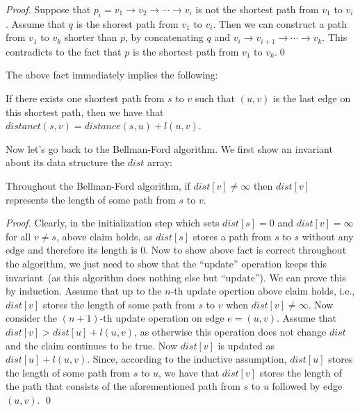 \emph{Proof.} Suppose that 
$p_i = v_1 \to v_2 \to \cdots \to v_i$
is not the shortest path from $v_1$ to $v_i$. Assume that
$q$ is the shorest path from $v_1$ to $v_i$.
Then we can construct a path from $v_1$ to $v_k$ shorter than $p$,
by concatenating $q$ and $v_i \to v_{i+1} \to \cdots \to v_k$.
This contradicts to the fact that $p$ is the shortest path from $v_1$ to $v_k$.\qed

The above fact immediately implies the following:

\begin{fact}
If there exists one shortest path from $s$ to $v$ such that $(u,v)$ is the last edge
on this shortest path, then we have that $distanct(s,v) = distance(s,u) + l(u,v)$.
\end{fact}

Now let's go back to the Bellman-Ford algorithm. 
We first show an invariant about its data structure the $dist$ array: 

\begin{fact}
\label{fact1}
Throughout the Bellman-Ford algorithm, if $dist[v] \neq \infty$ then $dist[v]$ represents the length of some path from $s$ to $v$.
\end{fact}

\emph{Proof.} Clearly, in the initialization step which sets $dist[s] = 0$ and $dist[v] = \infty$ for all $v\neq s$, above claim holds,
as $dist[s]$ stores a path from $s$ to $s$ without any edge and therefore its length is 0.
Now to show above fact is correct throughout the algorithm, we just need to show that the ``update'' operation keeps
this invariant~(as this algorithm does nothing else but ``update'').
We can prove this by induction. %
Assume that up to the $n$-th update opertion
above claim holds, i.e., $dist[v]$ stores the length of some path from $s$ to $v$ when $dist[v] \neq \infty$.
Now consider the $(n+1)$-th update operation on edge $e = (u,v)$. Assume that $dist[v] > dist[u] + l(u,v)$, as otherwise this operation does not change $dist$ 
and the claim continues to be true.
Now $dist[v]$ is updated as $dist[u] + l(u,v)$. Since, according to the inductive assumption, $dist[u]$ stores the length of some path from $s$ to $u$,
we have that $dist[v]$ stores the length of the path that consists of the aforementioned path from $s$ to $u$ followed by edge $(u,v)$. \qed

